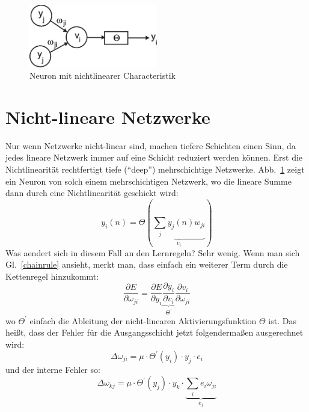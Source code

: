 \documentclass[12pt]{article}
\begin{document}
\begin{figure}[!hbt]
\begin{center}
\mbox{\includegraphics[width=0.5\textwidth]{nonlin}}
\end{center}
\caption{Neuron mit nichtlinearer Characteristik
\label{nonlin}}
\end{figure}

\section{Nicht-lineare Netzwerke}
Nur wenn Netzwerke nicht-linear sind, machen tiefere Schichten einen
Sinn, da jedes lineare Netzwerk immer auf eine Schicht reduziert
werden können.  Erst die Nichtlinearität rechtfertigt tiefe (``deep'')
mehrschichtige Netzwerke.  Abb.~\ref{nonlin} zeigt ein Neuron von
solch einem mehrschichtigen Netzwerk, wo die lineare Summe dann durch
eine Nichtlinearität geschickt wird:
\begin{equation}
  y_i(n) = \Theta\left(\underbrace{\sum_j y_j(n) w_{ji}}_{v_i} \right) \label{nonlinear_sum}
\end{equation}
Was aendert sich in diesem Fall an den Lernregeln? Sehr wenig. Wenn man sich Gl.~\ref{chainrule} ansieht, merkt man, dass einfach
ein weiterer Term durch die Kettenregel hinzukommt:
 \begin{equation}
 \frac{\partial E}{\partial \omega_{ji}}  = \frac{\partial E}{\partial y_i} \underbrace{\frac{\partial y_i}{\partial v_i}}_{\Theta^\prime} \frac{\partial v_i}{\partial \omega_{ji}}
 \end{equation}
 wo $\Theta^\prime$ einfach die Ableitung der nicht-linearen Aktivierungsfunktion $\Theta$ ist. Das heißt, dass der Fehler für die
 Ausgangsschicht jetzt folgendermaßen ausgerechnet wird:
\begin{equation}
  \Delta\omega_{ji} = \mu \cdot \Theta^\prime(y_i) \cdot y_j \cdot e_i 
\end{equation}
und der interne Fehler so:
\begin{equation}
\Delta\omega_{kj} = \mu \cdot \Theta^\prime(y_j) \cdot y_k \cdot \underbrace{\sum_i e_i \omega_{ji}}_{e_j} 
\end{equation}
\end{document}
